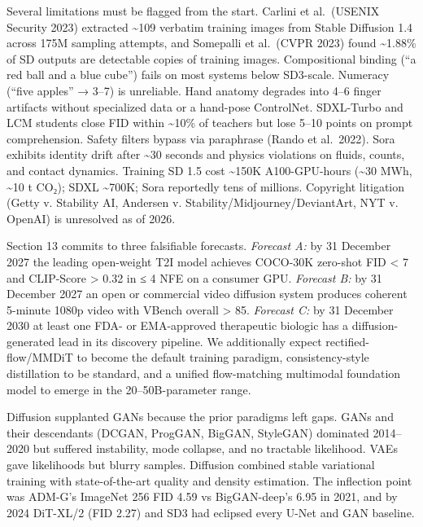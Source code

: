 \documentclass{article}
\begin{document}
Several limitations must be flagged from the start. Carlini et al.~(USENIX Security 2023) extracted \textasciitilde109 verbatim training images from Stable Diffusion 1.4 across 175M sampling attempts, and Somepalli et al.~(CVPR 2023) found \textasciitilde1.88\% of SD outputs are detectable copies of training images. Compositional binding (``a red ball and a blue cube'') fails on most systems below SD3-scale. Numeracy (``five apples'' → 3--7) is unreliable. Hand anatomy degrades into 4--6 finger artifacts without specialized data or a hand-pose ControlNet. SDXL-Turbo and LCM students close FID within \textasciitilde10\% of teachers but lose 5--10 points on prompt comprehension. Safety filters bypass via paraphrase (Rando et al.~2022). Sora exhibits identity drift after \textasciitilde30 seconds and physics violations on fluids, counts, and contact dynamics. Training SD 1.5 cost \textasciitilde150K A100-GPU-hours (\textasciitilde30 MWh, \textasciitilde10 t CO₂); SDXL \textasciitilde700K; Sora reportedly tens of millions. Copyright litigation (Getty v. Stability AI, Andersen v. Stability/Midjourney/DeviantArt, NYT v. OpenAI) is unresolved as of 2026.

Section 13 commits to three falsifiable forecasts. \emph{Forecast A:} by 31 December 2027 the leading open-weight T2I model achieves COCO-30K zero-shot FID \textless{} 7 and CLIP-Score \textgreater{} 0.32 in ≤ 4 NFE on a consumer GPU. \emph{Forecast B:} by 31 December 2027 an open or commercial video diffusion system produces coherent 5-minute 1080p video with VBench overall \textgreater{} 85. \emph{Forecast C:} by 31 December 2030 at least one FDA- or EMA-approved therapeutic biologic has a diffusion-generated lead in its discovery pipeline. We additionally expect rectified-flow/MMDiT to become the default training paradigm, consistency-style distillation to be standard, and a unified flow-matching multimodal foundation model to emerge in the 20--50B-parameter range.

Diffusion supplanted GANs because the prior paradigms left gaps. GANs \citep{goodfellow2014generativeadversar} and their descendants (DCGAN, ProgGAN, BigGAN, StyleGAN) dominated 2014--2020 but suffered instability, mode collapse, and no tractable likelihood. VAEs \citep{kingma2014autoencodingvariat} gave likelihoods but blurry samples. Diffusion combined stable variational training with state-of-the-art quality and density estimation. The inflection point was ADM-G's ImageNet 256 FID 4.59 vs BigGAN-deep's 6.95 in 2021, and by 2024 DiT-XL/2 (FID 2.27) and SD3 had eclipsed every U-Net and GAN baseline.
\end{document}
